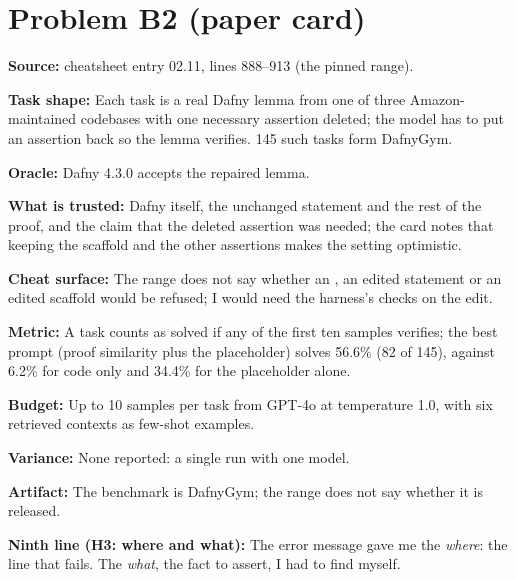 \documentclass[11pt]{article}
\begin{document}
\section*{Problem B2 (paper card)}\label{ans:B2}
\begin{answer}
\textbf{Source:} cheatsheet entry 02.11, lines 888--913 (the pinned range).

\textbf{Task shape:} Each task is a real Dafny lemma from one of three
Amazon-maintained codebases with one necessary assertion deleted; the model
has to put an assertion back so the lemma verifies. 145 such tasks form
DafnyGym.

\textbf{Oracle:} Dafny 4.3.0 accepts the repaired lemma.

\textbf{What is trusted:} Dafny itself, the unchanged statement and the rest
of the proof, and the claim that the deleted assertion was needed; the card
notes that keeping the scaffold and the other assertions makes the setting
optimistic.

\textbf{Cheat surface:} The range does not say whether an , an
edited statement or an edited scaffold would be refused; I would need the
harness's checks on the edit.

\textbf{Metric:} A task counts as solved if any of the first ten samples
verifies; the best prompt (proof similarity plus the placeholder) solves
56.6\% (82 of 145), against 6.2\% for code only and 34.4\% for the
placeholder alone.

\textbf{Budget:} Up to 10 samples per task from GPT-4o at temperature 1.0,
with six retrieved contexts as few-shot examples.

\textbf{Variance:} None reported: a single run with one model.

\textbf{Artifact:} The benchmark is DafnyGym; the range does not say whether
it is released.

\textbf{Ninth line (H3: where and what):} The error message gave me the
\emph{where}: the line that fails. The \emph{what}, the fact to assert, I had
to find myself.
\end{answer}
\end{document}

